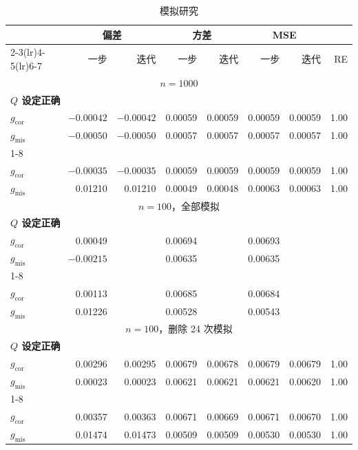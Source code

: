 \begin{table}[p]
\centering
\caption{模拟研究}
\label{tab:ch05-simulation}
\begingroup
\footnotesize
\setlength{\tabcolsep}{3.5pt}
\renewcommand{\arraystretch}{1.12}
\begin{tabular}{lrrrrrrr}
\toprule
&\multicolumn{2}{c}{偏差}&\multicolumn{2}{c}{方差}
&\multicolumn{2}{c}{MSE}&\\
\cmidrule(lr){2-3}\cmidrule(lr){4-5}\cmidrule(lr){6-7}
&一步&迭代&一步&迭代&一步&迭代&RE\\
\midrule
\multicolumn{8}{c}{$n=1000$}\\
\multicolumn{8}{l}{\textbf{$Q$ 设定正确}}\\
$g_{\mathrm{cor}}$&$-0.00042$&$-0.00042$&0.00059&0.00059&0.00059&0.00059&1.00\\
$g_{\mathrm{mis}}$&$-0.00050$&$-0.00050$&0.00057&0.00057&0.00057&0.00057&1.00\\
\cmidrule{1-8}
\multicolumn{8}{l}{\textbf{$Q$ 设定错误}}\\
$g_{\mathrm{cor}}$&$-0.00035$&$-0.00035$&0.00059&0.00059&0.00059&0.00059&1.00\\
$g_{\mathrm{mis}}$&0.01210&0.01210&0.00049&0.00048&0.00063&0.00063&1.00\\
\midrule
\multicolumn{8}{c}{$n=100$，全部模拟}\\
\multicolumn{8}{l}{\textbf{$Q$ 设定正确}}\\
$g_{\mathrm{cor}}$&0.00049&&0.00694&&0.00693&&\\
$g_{\mathrm{mis}}$&$-0.00215$&&0.00635&&0.00635&&\\
\cmidrule{1-8}
\multicolumn{8}{l}{\textbf{$Q$ 设定错误}}\\
$g_{\mathrm{cor}}$&0.00113&&0.00685&&0.00684&&\\
$g_{\mathrm{mis}}$&0.01226&&0.00528&&0.00543&&\\
\midrule
\multicolumn{8}{c}{$n=100$，删除 24 次模拟}\\
\multicolumn{8}{l}{\textbf{$Q$ 设定正确}}\\
$g_{\mathrm{cor}}$&0.00296&0.00295&0.00679&0.00678&0.00679&0.00679&1.00\\
$g_{\mathrm{mis}}$&0.00023&0.00023&0.00621&0.00621&0.00621&0.00620&1.00\\
\cmidrule{1-8}
\multicolumn{8}{l}{\textbf{$Q$ 设定错误}}\\
$g_{\mathrm{cor}}$&0.00357&0.00363&0.00671&0.00669&0.00671&0.00670&1.00\\
$g_{\mathrm{mis}}$&0.01474&0.01473&0.00509&0.00509&0.00530&0.00530&1.00\\

\end{tabular}
\end{table}
